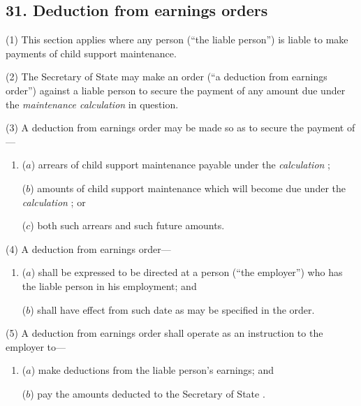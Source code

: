 \documentclass[12pt,a4paper]{article}
\begin{document}
\subsection{31. Deduction from earnings orders}

(1) This section applies where any person (“the liable person”) is liable to make payments of child support maintenance.

(2) The 
Secretary of State  %
may make an order (“a deduction from earnings order”) against a liable person to secure the payment of any amount due under the 
\emph{maintenance calculation}  %
in question.

(3) A deduction from earnings order may be made so as to secure the payment of—
\begin{enumerate}\item[]
($a$) arrears of child support maintenance payable under the 
\emph{calculation}%
;

($b$) amounts of child support maintenance which will become due under the 
\emph{calculation}%
; or

($c$) both such arrears and such future amounts.
\end{enumerate}

(4) A deduction from earnings order—
\begin{enumerate}\item[]
($a$) shall be expressed to be directed at a person (“the employer”) who has the liable person in his employment; and

($b$) shall have effect from such date as may be specified in the order.
\end{enumerate}

(5) A deduction from earnings order shall operate as an instruction to the employer to—
\begin{enumerate}\item[]
($a$) make deductions from the liable person’s earnings; and

($b$) pay the amounts deducted to the 
Secretary of State%
.
\end{enumerate}
\end{document}
